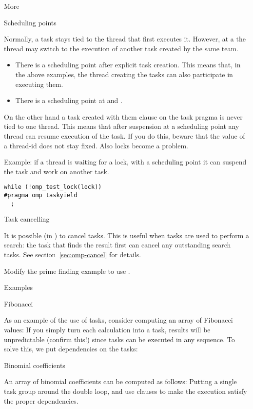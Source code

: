  {More}

 {Scheduling points}

Normally, a task stays tied to the thread that first executes it.
However, at a  the thread may
switch to the execution of another task created by the same team.
\begin{itemize}
\item There is a scheduling point after explicit task creation. This
  means that, in the above examples, the thread creating the tasks can
  also participate in executing them.
\item There is a scheduling point at  and .
\end{itemize}

On the other hand a task created with them  clause
on the task pragma is never tied to one thread. This means that after
suspension at a scheduling point any thread can resume execution of
the task.
If you do this, beware
that the value of a thread-id does not stay fixed. Also locks become a problem.

Example: if a thread is waiting for a lock, with a scheduling point it
can suspend the task and work on another task.
\begin{lstlisting}
while (!omp_test_lock(lock))
#pragma omp taskyield
  ;
\end{lstlisting}

 {Task cancelling}

It is possible (in ) to cancel
tasks. This is useful when tasks are used to perform a search: the
task that finds the result first can cancel any outstanding search
tasks.
See section~\ref{sec:omp-cancel} for details.

\begin{exercise}
  Modify the prime finding example to use .
\end{exercise}

 {Examples}

 {Fibonacci}

As an example of the use of tasks, consider computing an array of Fibonacci values:
%
%
If you simply turn each calculation into a task, results will be
unpredictable (confirm this!) since tasks can be executed in any sequence.
To solve this, we put dependencies on the tasks:
%

 {Binomial coefficients}

\begin{exercise}
  An array of binomial coefficients can be computed as follows:
  Putting a single task group around the double loop, and use
   clauses to make the execution satisfy the proper dependencies.
\end{exercise}

